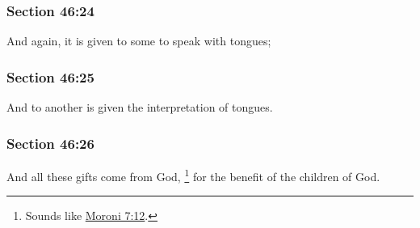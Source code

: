 	\subsubsection{Section 46:24} %
		\label{DC46-24}

		And again, it is given to some to speak with tongues;


	\subsubsection{Section 46:25} %
		\label{DC46-25}

		And to another is given the interpretation of tongues.


	\subsubsection{Section 46:26} %
		\label{DC46-26}

		And all these gifts come from God,%
			\footnote{%
				Sounds like \hyperref[MORONI-7-12]{Moroni 7:12}.
				}
		for the benefit of the children of God.


